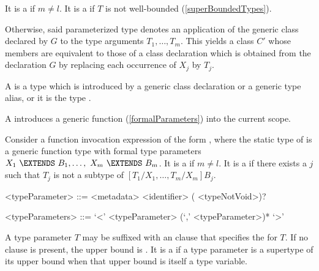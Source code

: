 \documentclass[makeidx]{article}
\begin{document}
\LMHash{}%
It is a  if $m \not= l$.
It is a  if $T$ is not well-bounded
(\ref{superBoundedTypes}).

\LMHash{}%
Otherwise, said parameterized type  denotes
an application of the generic class declared by $G$ to the type arguments
$T_1, \ldots, T_m$.
This yields a class $C'$ whose members are equivalent to those of
a class declaration which is obtained from the declaration $G$ by replacing
each occurrence of $X_j$ by $T_j$.



\LMHash{}%
A  is a type which is introduced by
a generic class declaration or a generic type alias,
or it is the type .

\LMHash{}%
A 
introduces a generic function (\ref{formalParameters}) into the current scope.

\LMHash{}%
Consider a function invocation expression of the form
,
where the static type of  is a generic function type
with formal type parameters
$X_1\ \EXTENDS\ B_1, \ldots,\ X_m\ \EXTENDS\ B_m$.
It is a  if $m \not= l$.
It is a  if there exists a $j$
such that $T_j$ is not a subtype of $[T_1/X_1, \ldots, T_m/X_m]B_j$.


\begin{grammar}
<typeParameter> ::= <metadata> <identifier> (\EXTENDS{} <typeNotVoid>)?

<typeParameters> ::= `<' <typeParameter> (`,' <typeParameter>)* `>'
\end{grammar}

\LMHash{}%
A type parameter $T$ may be suffixed with an \EXTENDS{} clause
that specifies the  for $T$.
If no \EXTENDS{} clause is present, the upper bound is .
It is a
 if a type parameter is a supertype of its upper bound
when that upper bound is itself a type variable.
\end{document}
